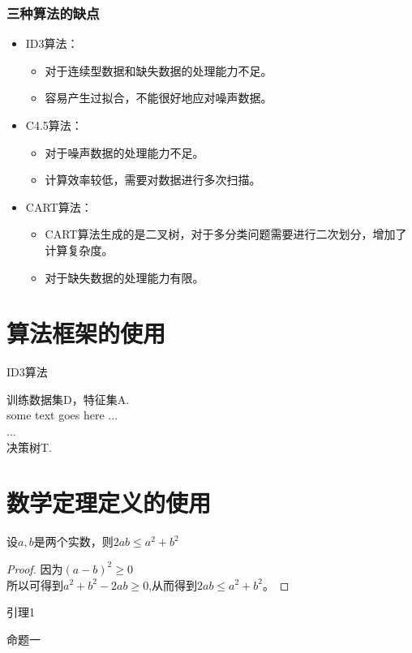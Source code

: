 \documentclass{SHUarticle}
\begin{document}
\subsubsection{三种算法的缺点}
\begin{itemize}
	\item ID3算法：
	\begin{itemize}
		\item 对于连续型数据和缺失数据的处理能力不足。
		\item 容易产生过拟合，不能很好地应对噪声数据。
	\end{itemize}
	\item C4.5算法：
	\begin{itemize}
		\item 对于噪声数据的处理能力不足。
		\item 计算效率较低，需要对数据进行多次扫描。
	\end{itemize}
	\item CART算法：
	\begin{itemize}
		\item CART算法生成的是二叉树，对于多分类问题需要进行二次划分，增加了计算复杂度。
		\item 对于缺失数据的处理能力有限。
	\end{itemize}
\end{itemize}
\section{算法框架的使用}
 \begin{algorithm}
	\caption{ID3算法}
	\label{algo:ref}
	\begin{algorithmic}[1]
		\REQUIRE 训练数据集D，特征集A.  %
		\ENSURE ~\\           %
		some text goes here ... \\
		\STATE ... \\  %
		\ENDWHILE
		\RETURN 决策树T.  %
	\end{algorithmic}
\end{algorithm}
\section{数学定理定义的使用}
\begin{theorem}
	 设$a,b$是两个实数，则$2ab\leq a^2+b^2$
\end{theorem}
\begin{proof}
	因为$(a-b)^{2}\geq 0$\\
	所以可得到$a^{2}+b^{2}-2ab\geq 0$,从而得到$2ab\leq a^2+b^2$。
\end{proof}
\begin{lemma}
	引理1
\end{lemma}
\begin{proposition}
	命题一
\end{proposition}
\end{document}
